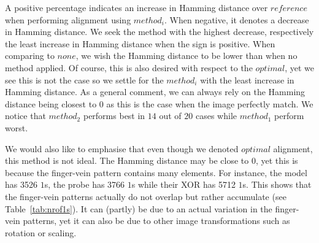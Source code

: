 A positive percentage indicates an increase in Hamming distance over $reference$ when performing alignment using $method_i$. When negative, it denotes a decrease in Hamming distance. 
We seek the method with the highest decrease, respectively the least increase in Hamming distance when the sign is positive. 
When comparing to $none$, we wish the Hamming distance to be lower than when no method applied. Of course, this is also desired with respect to the $optimal$, yet we see this is not the case so we settle for the $method_i$ with the least increase in Hamming distance.
As a general comment, we can always rely on the Hamming distance being closest to 0 as this is the case when the image perfectly match. We notice that $method_2$ performs best in $14$ out of $20$ cases while $method_1$ perform worst.

We would also like to emphasise that even though we denoted $optimal$ alignment, this method is not ideal. The Hamming distance may be close to 0, yet this is because the finger-vein pattern contains many elements. For instance, the model has 3526 $1$s, the probe has 3766 $1$s while their XOR has 5712 $1$s. This shows that the finger-vein patterns actually do not overlap but rather accumulate (see Table~\ref{tab:nrof1s}).
It can (partly) be due to an actual variation in the finger-vein patterns, yet it can also be due to other image transformations such as rotation or scaling. 


